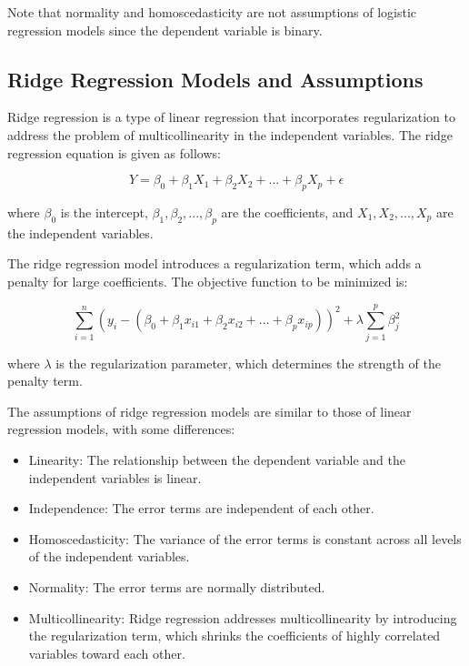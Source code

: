 \documentclass{beamer}
\begin{document}
Note that normality and homoscedasticity are not assumptions of logistic regression models since the dependent variable is binary.

\subsection{Ridge Regression Models and Assumptions}
Ridge regression is a type of linear regression that incorporates regularization to address the problem of multicollinearity in the independent variables. The ridge regression equation is given as follows:

\begin{equation}
Y = \beta_0 + \beta_1X_1 + \beta_2X_2 + ... + \beta_pX_p + \epsilon
\end{equation}

where $\beta_0$ is the intercept, $\beta_1, \beta_2, ..., \beta_p$ are the coefficients, and $X_1, X_2, ..., X_p$ are the independent variables.

The ridge regression model introduces a regularization term, which adds a penalty for large coefficients. The objective function to be minimized is:

\begin{equation}
\sum_{i=1}^{n} (y_i - (\beta_0 + \beta_1x_{i1} + \beta_2x_{i2} + ... + \beta_px_{ip}))^2 + \lambda\sum_{j=1}^{p} \beta_j^2
\end{equation}

where $\lambda$ is the regularization parameter, which determines the strength of the penalty term.

The assumptions of ridge regression models are similar to those of linear regression models, with some differences:

\begin{itemize}
\item Linearity: The relationship between the dependent variable and the independent variables is linear.
\item Independence: The error terms are independent of each other.
\item Homoscedasticity: The variance of the error terms is constant across all levels of the independent variables.
\item Normality: The error terms are normally distributed.
\item Multicollinearity: Ridge regression addresses multicollinearity by introducing the regularization term, which shrinks the coefficients of highly correlated variables toward each other.
\end{itemize}
\end{document}
